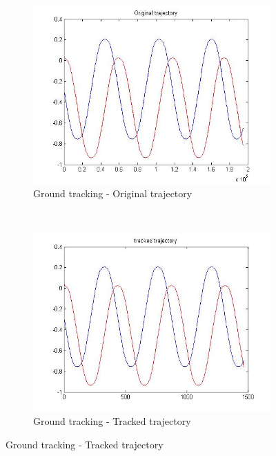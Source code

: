 \begin{figure}[htp]
	\centering
	\begin{subfigure}{0.45\linewidth}
		\centering
		\includegraphics[width=\linewidth]{../Images/c3/sim1_traj_ori}
		\caption{Ground tracking - Original trajectory}
		\label{fig:sim1_traj_ori}
	\end{subfigure}
	~
	\begin{subfigure}{0.45\linewidth}
		\centering
		\includegraphics[width=\linewidth]{../Images/c3/sim1_traj_track}
		\caption{Ground tracking - Tracked trajectory}
		\label{fig:sim1_traj_track}
	\end{subfigure}

\end{figure}


